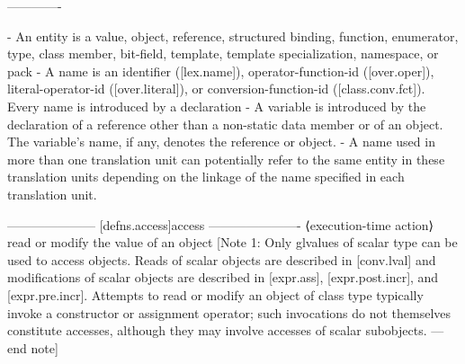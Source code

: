 -------------

- An entity is a value, object, reference, structured binding, function, enumerator, type, class member, bit-field, template, template specialization, namespace, or pack
- A name is an identifier ([lex.name]), operator-function-id ([over.oper]), literal-operator-id ([over.literal]), or conversion-function-id ([class.conv.fct]).
Every name is introduced by a declaration
- A variable is introduced by the declaration of a reference other than a non-static data member or of an object. The variable's name, if any, denotes the reference or object.
- A name used in more than one translation unit can potentially refer to the same entity in these translation units depending on the linkage of the name specified in each translation unit.

---------------------
[defns.access]access
----------------------
⟨execution-time action⟩ read or modify the value of an object
[Note 1: Only glvalues of scalar type can be used to access objects. Reads of scalar objects are described in [conv.lval] and modifications of scalar objects are described in [expr.ass], [expr.post.incr], and [expr.pre.incr]. Attempts to read or modify an object of class type typically invoke a constructor or assignment operator; such invocations do not themselves constitute accesses, although they may involve accesses of scalar subobjects. — end note]



